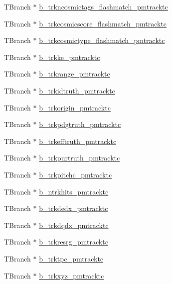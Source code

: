 \begin{DoxyCompactItemize}
\item 
T\-Branch $\ast$ \hyperlink{classanatree_afd86722fb60b2457a725531f6ffb7d3e}{b\-\_\-trkncosmictags\-\_\-flashmatch\-\_\-pmtracktc}
\item 
T\-Branch $\ast$ \hyperlink{classanatree_aee0d6ae30f16a0c87abc5667b3105853}{b\-\_\-trkcosmicscore\-\_\-flashmatch\-\_\-pmtracktc}
\item 
T\-Branch $\ast$ \hyperlink{classanatree_a07f8f80d4f4af81e0ee35a2980edc14b}{b\-\_\-trkcosmictype\-\_\-flashmatch\-\_\-pmtracktc}
\item 
T\-Branch $\ast$ \hyperlink{classanatree_a24d7d9999c145731a75bc9d9b44ba992}{b\-\_\-trkke\-\_\-pmtracktc}
\item 
T\-Branch $\ast$ \hyperlink{classanatree_a609f2fc9fbce7c97821e45c8f63d7cba}{b\-\_\-trkrange\-\_\-pmtracktc}
\item 
T\-Branch $\ast$ \hyperlink{classanatree_ad525724bfceba035cd26eb4deef49e04}{b\-\_\-trkidtruth\-\_\-pmtracktc}
\item 
T\-Branch $\ast$ \hyperlink{classanatree_a0ad0f7bddd5f1b4397dda164e4042cc2}{b\-\_\-trkorigin\-\_\-pmtracktc}
\item 
T\-Branch $\ast$ \hyperlink{classanatree_a482a9f08a15526c82c270fac97fb9623}{b\-\_\-trkpdgtruth\-\_\-pmtracktc}
\item 
T\-Branch $\ast$ \hyperlink{classanatree_a99f25dcf1c3d8664b11be0fd24ad3f5c}{b\-\_\-trkefftruth\-\_\-pmtracktc}
\item 
T\-Branch $\ast$ \hyperlink{classanatree_a932c2b2b4bb0861154fadb276ccc8564}{b\-\_\-trkpurtruth\-\_\-pmtracktc}
\item 
T\-Branch $\ast$ \hyperlink{classanatree_aaaef94e829eba30dd51c239035fd9efc}{b\-\_\-trkpitchc\-\_\-pmtracktc}
\item 
T\-Branch $\ast$ \hyperlink{classanatree_afab02fa6ac051ed290ba42ed48cf58f9}{b\-\_\-ntrkhits\-\_\-pmtracktc}
\item 
T\-Branch $\ast$ \hyperlink{classanatree_aa2a79f881e8f1501bc9b2389ce41efa0}{b\-\_\-trkdedx\-\_\-pmtracktc}
\item 
T\-Branch $\ast$ \hyperlink{classanatree_ac1169b3205896dc2e528589a89d883bc}{b\-\_\-trkdqdx\-\_\-pmtracktc}
\item 
T\-Branch $\ast$ \hyperlink{classanatree_a8f08ab65e45278c6d6da51bddbf79945}{b\-\_\-trkresrg\-\_\-pmtracktc}
\item 
T\-Branch $\ast$ \hyperlink{classanatree_a14d4038e695c9957078bf503aa27acab}{b\-\_\-trktpc\-\_\-pmtracktc}
\item 
T\-Branch $\ast$ \hyperlink{classanatree_a35e8d0eef681c1dbf65875395f9a4162}{b\-\_\-trkxyz\-\_\-pmtracktc}

\end{DoxyCompactItemize}
